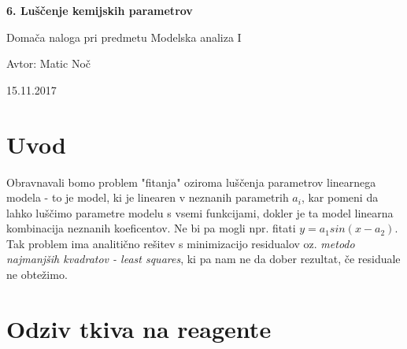 \documentclass[11pt, a4paper]{article}
\begin{document}
    \begin{center}
    {\LARGE\bfseries 6. Luščenje kemijskih parametrov\par}
    \vspace{1cm}
    
    {\Large Domača naloga pri predmetu Modelska analiza I\par}
    \vspace{0.2cm}
    {\normalsize Avtor: Matic Noč \par}
    \vspace{0.2cm}    
    {\normalsize 15.11.2017 \par}    

    
    \end{center}
\section{Uvod}
Obravnavali bomo problem "fitanja" oziroma luščenja parametrov linearnega modela - to je model, ki je linearen v neznanih parametrih $a_i$, kar pomeni da lahko luščimo parametre modelu s vsemi funkcijami, dokler je ta model linearna kombinacija neznanih koeficentov. Ne bi pa mogli npr. fitati $y = a_1 sin(x-a_2)$. Tak problem ima analitično rešitev s minimizacijo residualov oz. \textit{metodo najmanjših kvadratov - least squares}, ki pa nam ne da dober rezultat, če residuale ne obtežimo. 

\section{Odziv tkiva na reagente}
\end{document}
